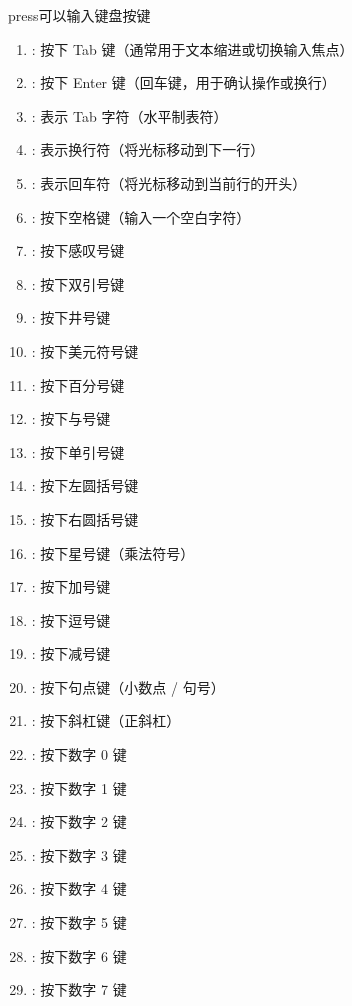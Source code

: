 press可以输入键盘按键
\begin{enumerate}[label=\arabic*)]
    \item {}: 按下 Tab 键（通常用于文本缩进或切换输入焦点）
    \item {}: 按下 Enter 键（回车键，用于确认操作或换行）
    \item {}: 表示 Tab 字符（水平制表符）
    \item {}: 表示换行符（将光标移动到下一行）
    \item {}: 表示回车符（将光标移动到当前行的开头）
    \item \codeinline{ }: 按下空格键（输入一个空白字符）
    \item \codeinline{!}: 按下感叹号键
    \item {}: 按下双引号键
    \item \codeinline{\#}: 按下井号键
    \item \codeinline{\$}: 按下美元符号键
    \item \codeinline{\%}: 按下百分号键
    \item \codeinline{\&}: 按下与号键
    \item {}: 按下单引号键
    \item \codeinline{(}: 按下左圆括号键
    \item \codeinline{)}: 按下右圆括号键
    \item \codeinline{*}: 按下星号键（乘法符号）
    \item \codeinline{+}: 按下加号键
    \item \codeinline{,}: 按下逗号键
    \item \codeinline{-}: 按下减号键
    \item {}: 按下句点键（小数点 / 句号）
    \item \codeinline{/}: 按下斜杠键（正斜杠）
    \item {}: 按下数字 0 键
    \item {}: 按下数字 1 键
    \item {}: 按下数字 2 键
    \item {}: 按下数字 3 键
    \item {}: 按下数字 4 键
    \item {}: 按下数字 5 键
    \item {}: 按下数字 6 键
    \item {}: 按下数字 7 键

\end{enumerate}
